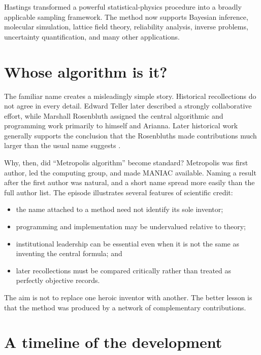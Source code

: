 \documentclass[11pt]{article}
\begin{document}
Hastings transformed a powerful statistical-physics procedure into a broadly
applicable sampling framework. The method now supports Bayesian inference,
molecular simulation, lattice field theory, reliability analysis, inverse
problems, uncertainty quantification, and many other applications.

\section{Whose algorithm is it?}

The familiar name creates a misleadingly simple story. Historical recollections
do not agree in every detail. Edward Teller later described a strongly
collaborative effort, while Marshall Rosenbluth assigned the central algorithmic
and programming work primarily to himself and Arianna. Later historical work
generally supports the conclusion that the Rosenbluths made contributions much
larger than the usual name suggests \cite{gubernatis2005}.

Why, then, did ``Metropolis algorithm'' become standard? Metropolis was first
author, led the computing group, and made MANIAC available. Naming a result after
the first author was natural, and a short name spread more easily than the full
author list. The episode illustrates several features of scientific credit:

\begin{itemize}
  \item the name attached to a method need not identify its sole inventor;
  \item programming and implementation may be undervalued relative to theory;
  \item institutional leadership can be essential even when it is not the same
        as inventing the central formula; and
  \item later recollections must be compared critically rather than treated as
        perfectly objective records.
\end{itemize}

The aim is not to replace one heroic inventor with another. The better lesson is
that the method was produced by a network of complementary contributions.

\section{A timeline of the development}
\end{document}
